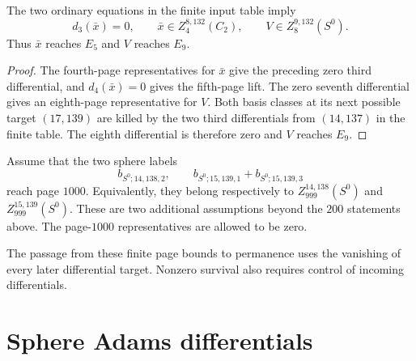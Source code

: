 \begin{theorem}
\label{sem:SSComputation:selected-class-survival}
The two ordinary equations in the finite input table imply
\[
 d_3(\bar x)=0,\qquad \bar x\in Z_4^{8,132}(C_2),\qquad
 V\in Z_8^{9,132}(S^0).
\]
Thus $\bar x$ reaches $E_5$ and $V$ reaches $E_9$.
\end{theorem}
\begin{proof}
The fourth-page representatives for $\bar x$ give the preceding zero
third differential, and $d_4(\bar x)=0$ gives the fifth-page lift.
The zero seventh differential gives an eighth-page representative for $V$.
Both basis classes at its next possible target $(17,139)$ are killed by
the two third differentials from $(14,137)$ in the finite table.
The eighth differential is therefore zero and $V$ reaches $E_9$.
\end{proof}

\begin{theorem}
\label{sem:SSComputation:staircase-inputs}
Assume that the two sphere labels
\[
 b_{S^0;14,138,2},\qquad
 b_{S^0;15,139,1}+b_{S^0;15,139,3}
\]
reach page $1000$. Equivalently, they belong respectively to
$Z_{999}^{14,138}(S^0)$ and $Z_{999}^{15,139}(S^0)$.
These are two additional assumptions beyond the $200$ statements above.
The page-$1000$ representatives are allowed to be zero.
\end{theorem}
The passage from these finite page bounds to permanence uses the
vanishing of every later differential target. Nonzero survival also
requires control of incoming differentials.


\section{Sphere Adams differentials}


